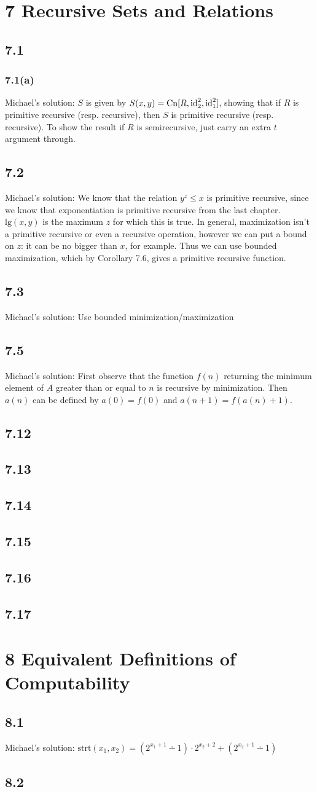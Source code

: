 \documentclass{article}
\newcommand\s{\section*}
\renewcommand\ss{\subsection*}
\newcommand\sss{\subsubsection*}
\newcommand\ms{Michael's solution: } %
\begin{document}
\s{7 Recursive Sets and Relations}
\ss{7.1}
\sss{7.1(a)}
\ms $S$ is given by $S(x,y)=\mathrm{Cn}[R,\mathrm{id}^2_2,\mathrm{id}^2_1]$, showing that if $R$ is primitive recursive (resp. recursive), then $S$ is primitive recursive (resp. recursive).  To show the result if $R$ is semirecursive, just carry an extra $t$ argument through.
\ss{7.2}
\ms We know that the relation $y^z\leq x$ is primitive recursive, since we know that exponentiation is primitive recursive from the 
last chapter.  $\mathrm{lg}(x, y)$ is the maximum $z$ for which
this is true.  In general, maximization isn't a primitive recursive or even a recursive operation, however we can put a bound on $z$: it can be no bigger than $x$, for example.  Thus we can use bounded maximization, which by Corollary 7.6, gives a primitive recursive function.
\ss{7.3}
\ms Use bounded minimization/maximization
\ss{7.5}
\ms First observe that the function $f(n)$ returning the minimum element of $A$ greater than or equal to $n$ is recursive by minimization.  Then $a(n)$ can be defined by $a(0) = f(0)$ and $a(n + 1) = f(a(n) + 1)$.
\ss{7.12}
\ss{7.13}
\ss{7.14}
\ss{7.15}
\ss{7.16}
\ss{7.17}

\s{8 Equivalent Definitions of Computability}
\ss{8.1}
\ms $\mathrm{strt}(x_1,x_2) = (2^{x_1+1}\dotminus 1)\cdot 2^{x_2+2}+(2^{x_2+1}\dotminus 1)$
\ss{8.2}
\end{document}
